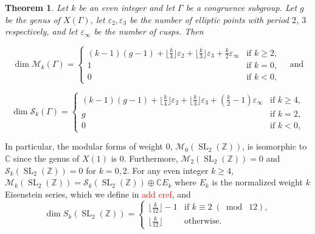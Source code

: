\documentclass[10pt,leqno,twoside]{article}
\theoremstyle{plain}
\newtheorem{theorem}[lem]{Theorem}
\theoremstyle{definition}
\numberwithin{equation}{section}
\numberwithin{lem}{section}
\DeclareMathOperator{\SL}{SL}
\newcommand{\smod}[1]{\;(\bmod\; #1)}
\newcommand{\slz}{\SL_2(\mathbb{Z})}
\newcommand{\sai}[1]{\textcolor{red}{#1}}
\begin{document}
\begin{theorem}
    Let $k$ be an even integer and let $\varGamma$ be a congruence subgroup. Let $g$ be the genus of $X(\varGamma)$, let $\varepsilon_2,\varepsilon_3$ be the number of elliptic points with period $2$, $3$ respectively, and let $\varepsilon_\infty$ be the number of cusps. Then

    \[\dim \mathcal M_k(\varGamma) = \begin{cases}
        (k-1)(g-1) + \lfloor\frac{k}{4}\rfloor\varepsilon_2 + \lfloor\frac{k}{3}\rfloor\varepsilon_3 + \frac{k}{2}\varepsilon_\infty & \text{if $k\geq 2$},\\
        1 & \text{if $k = 0$},\\
        0 & \text{if $k<0$},
    \end{cases} \quad \text{and}\]

    \[\dim \mathcal S_k(\varGamma) = \begin{cases}
        (k-1)(g-1) + \lfloor\frac{k}{4}\rfloor\varepsilon_2 + \lfloor\frac{k}{3}\rfloor\varepsilon_3 + (\frac{k}{2}-1)\varepsilon_\infty & \text{if $k\geq 4$},\\
        g & \text{if $k = 2$},\\
        0 & \text{if $k<0$},
    \end{cases}\]
\end{theorem}

In particular, the modular forms of weight $0$, $\mathcal M_0(\slz)$, is isomorphic to $\mathbb C$ since the genus of $X(1)$ is $0$. Furthermore, $\mathcal M_2(\slz) = 0$ and $\mathcal S_k(\slz) = 0$ for $k = 0,2$. For any even integer $k\geq 4$, $\mathcal M_k(\slz) = \mathcal S_k(\slz)\oplus \mathbb CE_k$ where $E_k$ is the normalized weight $k$ Eisenstein series, which we define in \sai{add cref}, and \[\dim S_k(\slz) = \begin{cases}
    \lfloor \frac{k}{12}\rfloor - 1 & \text{if $k\equiv 2 \smod{12}$}, \\
    \lfloor \frac{k}{12}\rfloor & \text{otherwise.}
\end{cases}\]
\end{document}
